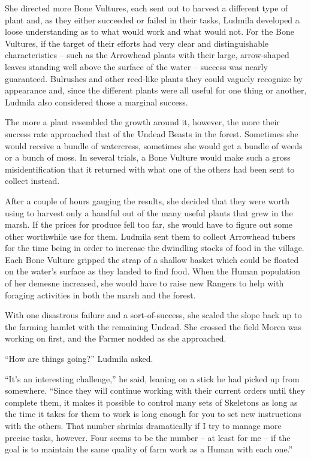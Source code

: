  

She directed more Bone Vultures, each sent out to harvest a different type of plant and, as they either succeeded or failed in their tasks, Ludmila developed a loose understanding as to what would work and what would not. For the Bone Vultures, if the target of their efforts had very clear and distinguishable characteristics – such as the Arrowhead plants with their large, arrow-shaped leaves standing well above the surface of the water – success was nearly guaranteed. Bulrushes and other reed-like plants they could vaguely recognize by appearance and, since the different plants were all useful for one thing or another, Ludmila also considered those a marginal success.

 

The more a plant resembled the growth around it, however, the more their success rate approached that of the Undead Beasts in the forest. Sometimes she would receive a bundle of watercress, sometimes she would get a bundle of weeds or a bunch of moss. In several trials, a Bone Vulture would make such a gross misidentification that it returned with what one of the others had been sent to collect instead.

 

After a couple of hours gauging the results, she decided that they were worth using to harvest only a handful out of the many useful plants that grew in the marsh. If the prices for produce fell too far, she would have to figure out some other worthwhile use for them. Ludmila sent them to collect Arrowhead tubers for the time being in order to increase the dwindling stocks of food in the village. Each Bone Vulture gripped the strap of a shallow basket which could be floated on the water's surface as they landed to find food. When the Human population of her demesne increased, she would have to raise new Rangers to help with foraging activities in both the marsh and the forest.

 

With one disastrous failure and a sort-of-success, she scaled the slope back up to the farming hamlet with the remaining Undead. She crossed the field Moren was working on first, and the Farmer nodded as she approached.

 

“How are things going?” Ludmila asked.

 

“It’s an interesting challenge,” he said, leaning on a stick he had picked up from somewhere. “Since they will continue working with their current orders until they complete them, it makes it possible to control many sets of Skeletons as long as the time it takes for them to work is long enough for you to set new instructions with the others. That number shrinks dramatically if I try to manage more precise tasks, however. Four seems to be the number – at least for me – if the goal is to maintain the same quality of farm work as a Human with each one.”

